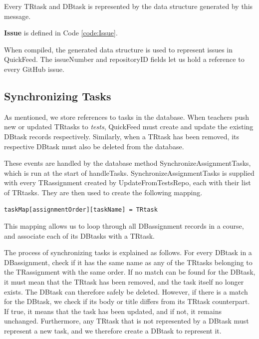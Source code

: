 Every TRtask and DBtask is represented by the data structure generated by this message.

\textbf{Issue} is defined in Code \ref{code:Issue}.



When compiled, the generated data structure is used to represent issues in QuickFeed.
The issueNumber and repositoryID fields let us hold a reference to every GitHub issue.

\subsection{Synchronizing Tasks}

As mentioned, we store references to tasks in the database.
When teachers push new or updated TRtasks to \textit{tests}, QuickFeed must create and update the existing DBtask records respectively.
Similarly, when a TRtask has been removed, its respective DBtask must also be deleted from the database.

These events are handled by the database method SynchronizeAssignmentTasks, which is run at the start of handleTasks.
SynchronizeAssignmentTasks is supplied with every TRassignment created by UpdateFromTestsRepo, each with their list of TRtasks.
They are then used to create the following mapping.
\begin{lstlisting}[caption={Task mapping}, language=Golang, label={code:task-mapping}, numbers=none, basicstyle=\ttfamily\footnotesize]
taskMap[assignmentOrder][taskName] = TRtask
\end{lstlisting}
This mapping allows us to loop through all DBassignment records in a course, and associate each of its DBtasks with a TRtask.

The process of synchronizing tasks is explained as follows.
For every DBtask in a DBassignment, check if it has the same name as any of the TRtasks belonging to the TRassignment with the same order.
If no match can be found for the DBtask, it must mean that the TRtask has been removed, and the task itself no longer exists.
The DBtask can therefore safely be deleted.
However, if there is a match for the DBtask, we check if its body or title differs from its TRtask counterpart.
If true, it means that the task has been updated, and if not, it remains unchanged.
Furthermore, any TRtask that is not represented by a DBtask must represent a new task, and we therefore create a DBtask to represent it.

